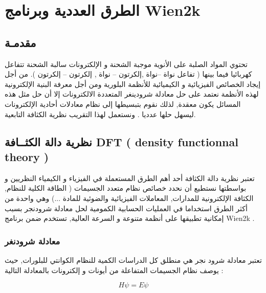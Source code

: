 
\chapter{ الطرق العددية وبرنامج Wien2k } %

\label{Chapter2} 


\section{ مقدمـة }

تحتوي المواد الصلبة على الأنوية موجبة الشحنة و الإلكترونات سالبة الشحنة تتفاعل كهربائيا فيما بينها ( تفاعل نواة –نواة ,إلكرتون – نواة , إلكرتون – إلكرتون ). 
من أجل إيجاد الخصائص الفيزيائية و الكيميائية للأنظمة البلورية ومن أجل معرفة البنية الإلكترونية لهذه الأنظمة  نعتمد على حل معادلة  شرودينغر المتعددة الالكترونات إلا أن حل مثل هذه المسائل يكون معقدة, لذلك نقوم بتبسيطها إلى نظام معادلات أحادية الإلكترونات ليسهل حلها عدديا . ونستعمل لهذا التقريب نظرية الكثافة التابعية.


\section{ ‫نظرية دالة الكثــافة‬ ‫‪DFT‬‬ ( density functionnal theory ) }

تعتبر نظرية دالة الكثافة أحد أهم الطرق المستعملة  في الفيزياء و الكيمياء النظريين  و بواسطتها نستطيع أن نحدد خصائص نظام متعدد الجسيمات ( الطاقة الكلية للنظام, الكثافة الإلكترونية للمدارات, المعاملات الفيزيائية والضوئية للمادة ...)   وهي واحدة من أكثر الطرق استخداما في العمليات الحسابية الكمومية  لحل معادلة شرودنجر بسبب إمكانية تطبيقها على أنظمة متنوعة و السرعة العالية, تستخدم ضمن برنامج Wien2k .

\subsection{ معادلة شرودنغر }

تعتبر معادلة  شرود نجر هي منطلق كل الدراسات الكمية للنظام الكوانتي للبلورات, حيث  يوصف نظام الجسيمات المتفاعلة من أيونات و إلكترونات بالمعادلة التالية :

\begin{equation}\label{key}
	H \psi = E \psi
\end{equation} 

